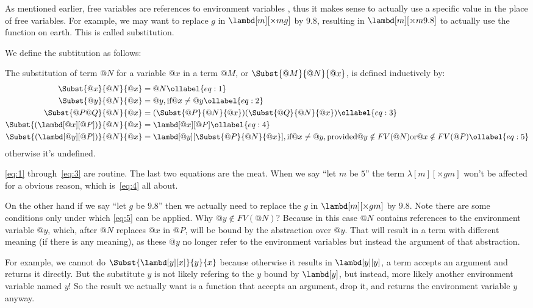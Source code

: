\documentclass[../../../include/open-logic-section]{subfiles}
\begin{document}

As mentioned earlier, free variables are references to environment variables
, thus it makes sense to actually use a specific value in the place of free
variables. For example, we may want to replace $g$ in
$\lambd[m][\times m g]$ by $9.8$, resulting in $\lambd[m][\times m
9.8]$ to actually use the function on earth. This is
called substitution.

We define the subtitution as follows:

\begin{defn}[Substitution]
  The substitution of term $@N$ for a variable $@x$ in a term $@M$, or
  $\Subst{@M}{@N}{@x}$,  is defined inductively by:
  \begin{align}
    \Subst{@x}{@N}{@x}       &= @N \ollabel{eq:1} \\
    \Subst{@y}{@N}{@x}       &= @y, \text{if} @x \neq @y \ollabel{eq:2} \\
    \Subst{@P@Q}{@N}{@x} &= (\Subst{@P}{@N}{@x}) (\Subst{@Q}{@N}{@x}) \ollabel{eq:3} \\
    \Subst{(\lambd[@x][@P])}{@N}{@x}  &= \lambd[@x][@P] \ollabel{eq:4} \\
    \Subst{(\lambd[@y][@P])}{@N}{@x}  &= \lambd[@y][\Subst{@P}{@N}{@x}], \text{if} @x \neq @y,
                                        \text{provided} @y \notin FV(@N) \text{or} @x \notin FV(@P) \ollabel{eq:5}
  \end{align}
  otherwise it's undefined.
\end{defn}

\eqref{eq:1} through~\eqref{eq:3} are routine. The last two equations are
the meat. When we say ``let $m$ be $5$'' the term
$\lambda[m][\times g m]$ won't be affected for a obvious reason, which
is~\eqref{eq:4} all about. 

On the other hand if we say ``let $g$ be $9.8$'' then we actually need
to replace the $g$ in $\lambd[m][\times g m]$ by $9.8$. Note there are
some conditions only under which
\eqref{eq:5} can be applied. Why $@y \notin FV(@N)$? Because in this
case $@N$ contains references to the environment variable $@y$, which,
after $@N$ replaces $@x$ in $@P$, will be bound by the abstraction over
$@y$. That will result in a term with different meaning (if there is any
meaning), as these $@y$ no longer refer to the environment variables but instead the argument
of that abstraction. 

For example, we cannot do $\Subst{\lambd[y][x]}{y}{x}$ because
otherwise it results in $\lambd[y][y]$, a term accepts an argument and
returns it directly. But the substitute $y$ is not likely refering
to the $y$ bound by $\lambd[y]$, but instead, more likely another
environment variable named $y$! So the result we actually want is a
function that accepts an argument, drop it, and returns the
environment variable $y$ anyway.
\end{document}
